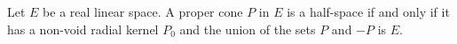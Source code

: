 Let $E$ be a real linear space. A proper cone $P$ in $E$ is a half-space if and only if it has a non-void radial kernel $P_0$ and the union of the sets $P$ and $-P$ is $E$.
